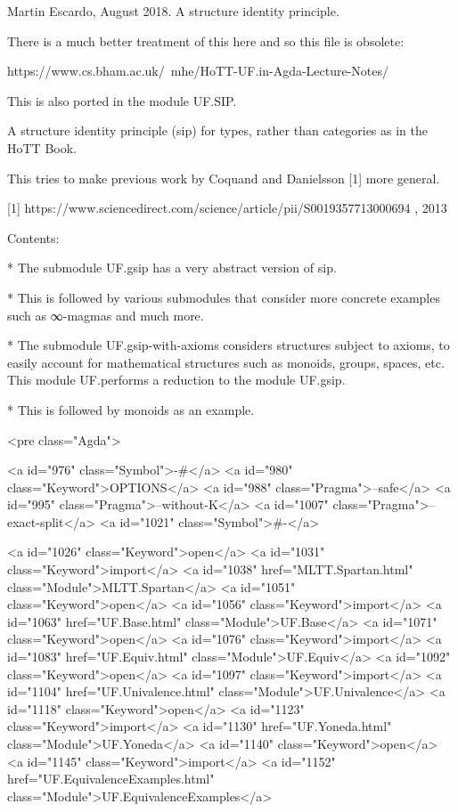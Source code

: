 Martin Escardo, August 2018. A structure identity principle.

There is a much better treatment of this here and so this file is
obsolete:

https://www.cs.bham.ac.uk/~mhe/HoTT-UF.in-Agda-Lecture-Notes/

This is also ported in the module UF.SIP.

A structure identity principle (sip) for types, rather than categories
as in the HoTT Book.

This tries to make previous work by Coquand and Danielsson [1] more
general.

[1] https://www.sciencedirect.com/science/article/pii/S0019357713000694 , 2013

Contents:

 * The submodule UF.gsip has a very abstract version of sip.

 * This is followed by various submodules that consider more concrete
   examples such as ∞-magmas and much more.

 * The submodule UF.gsip-with-axioms considers structures subject to
   axioms, to easily account for mathematical structures such as
   monoids, groups, spaces, etc. This module UF.performs a reduction to
   the module UF.gsip.

 * This is followed by monoids as an example.

<pre class="Agda">

<a id="976" class="Symbol">{-#</a> <a id="980" class="Keyword">OPTIONS</a> <a id="988" class="Pragma">--safe</a> <a id="995" class="Pragma">--without-K</a> <a id="1007" class="Pragma">--exact-split</a> <a id="1021" class="Symbol">#-}</a>

<a id="1026" class="Keyword">open</a> <a id="1031" class="Keyword">import</a> <a id="1038" href="MLTT.Spartan.html" class="Module">MLTT.Spartan</a>
<a id="1051" class="Keyword">open</a> <a id="1056" class="Keyword">import</a> <a id="1063" href="UF.Base.html" class="Module">UF.Base</a>
<a id="1071" class="Keyword">open</a> <a id="1076" class="Keyword">import</a> <a id="1083" href="UF.Equiv.html" class="Module">UF.Equiv</a>
<a id="1092" class="Keyword">open</a> <a id="1097" class="Keyword">import</a> <a id="1104" href="UF.Univalence.html" class="Module">UF.Univalence</a>
<a id="1118" class="Keyword">open</a> <a id="1123" class="Keyword">import</a> <a id="1130" href="UF.Yoneda.html" class="Module">UF.Yoneda</a>
<a id="1140" class="Keyword">open</a> <a id="1145" class="Keyword">import</a> <a id="1152" href="UF.EquivalenceExamples.html" class="Module">UF.EquivalenceExamples</a>


